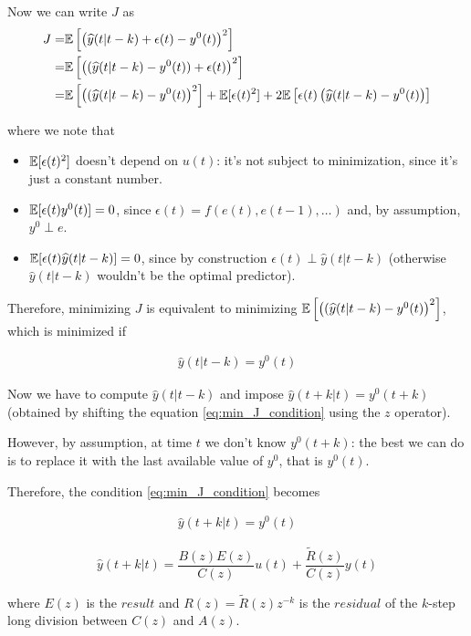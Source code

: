 Now we can write $J$ as 
\begin{align*}
	J =& \mathbb{E}\left[ \left( \widehat{y}(t|t-k) + \epsilon(t) - y^0(t) \right)^2 \right] \\
	  =& \mathbb{E}\left[ \left( (\widehat{y}(t|t-k) - y^0(t)) + \epsilon(t) \right)^2 \right] \\
	  =& \mathbb{E}\left[ \left( (\widehat{y}(t|t-k) - y^0(t) \right)^2 \right] + \mathbb{E}[\epsilon(t)^2 ] + 2 \mathbb{E}\left[ \epsilon(t) \left( \widehat{y}(t|t-k) - y^0(t) \right) \right] 
\end{align*}

where we note that

\begin{itemize}
	\item $\mathbb{E}[\epsilon(t)^2 ]$ doesn't depend on $u(t)$: it's not subject to minimization, since it's just a constant number.
	\item $\mathbb{E}[ \epsilon(t) y^0(t) ] = 0$, since $\epsilon(t) = f(e(t), e(t-1), \dots) $ and, by assumption, $y^0 \perp e$.
	\item $\mathbb{E}[ \epsilon(t) \widehat{y}(t|t-k) ] = 0$, since by construction $\epsilon(t) \perp \hat{y}(t|t-k)$ (otherwise $\hat{y}(t|t-k)$ wouldn't be the optimal predictor).
\end{itemize}

Therefore, minimizing $J$ is equivalent to minimizing  $\mathbb{E}\left[ \left( (\widehat{y}(t|t-k) - y^0(t) \right)^2 \right]$, which is minimized if

\begin{align}\label{eq:min_J_condition}
	\hat{y}(t|t-k) = y^0(t)
\end{align}

Now we have to compute $\hat{y}(t|t-k)$ and impose $\hat{y}(t+k|t) = y^0(t+k)$ (obtained by shifting the equation \ref{eq:min_J_condition} using the $z$ operator).

However, by assumption, at time $t$ we don't know $y^0(t+k)$: the best we can do is to replace it with the last available value of $y^0$, that is $y^0(t)$.

Therefore, the condition \ref{eq:min_J_condition} becomes 

\begin{align}\label{eq:new_min_J_condition}
	\hat{y}(t+k|t) = y^0(t)
\end{align}

\begin{rem}

	\[
		\hat{y}(t+k|t) = \frac{B(z) E(z)}{C(z)} u(t) + \frac{\tilde{R}(z)}{C(z)} y(t)
	\] 

	where $E(z)$ is the $result$ and $R(z) = \tilde{R}(z) z^{-k}$ is the $residual$ of the $k$-step long division between $C(z)$ and $A(z)$.

\end{rem}

